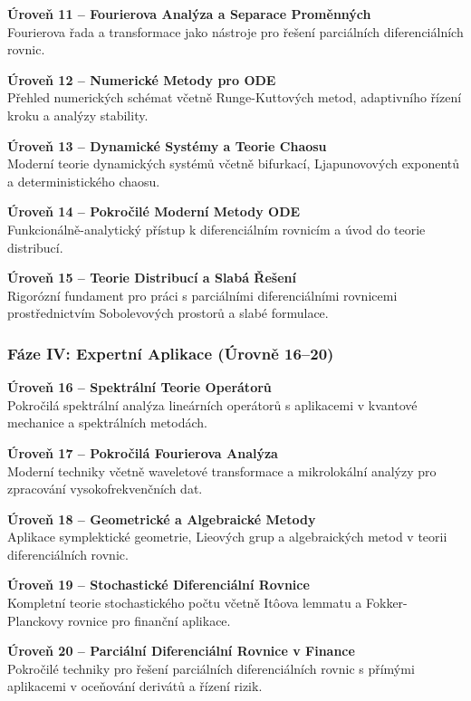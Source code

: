 \textbf{Úroveň 11 – Fourierova Analýza a Separace Proměnných}\\
Fourierova řada a transformace jako nástroje pro řešení parciálních diferenciálních rovnic.

\textbf{Úroveň 12 – Numerické Metody pro ODE}\\
Přehled numerických schémat včetně Runge-Kuttových metod, adaptivního řízení kroku a analýzy stability.

\textbf{Úroveň 13 – Dynamické Systémy a Teorie Chaosu}\\
Moderní teorie dynamických systémů včetně bifurkací, Ljapunovových exponentů a deterministického chaosu.

\textbf{Úroveň 14 – Pokročilé Moderní Metody ODE}\\
Funkcionálně-analytický přístup k diferenciálním rovnicím a úvod do teorie distribucí.

\textbf{Úroveň 15 – Teorie Distribucí a Slabá Řešení}\\
Rigorózní fundament pro práci s parciálními diferenciálními rovnicemi prostřednictvím Sobolevových prostorů a slabé formulace.

\subsubsection{Fáze IV: Expertní Aplikace (Úrovně 16–20)}

\textbf{Úroveň 16 – Spektrální Teorie Operátorů}\\
Pokročilá spektrální analýza lineárních operátorů s aplikacemi v kvantové mechanice a spektrálních metodách.

\textbf{Úroveň 17 – Pokročilá Fourierova Analýza}\\
Moderní techniky včetně waveletové transformace a mikrolokální analýzy pro zpracování vysokofrekvenčních dat.

\textbf{Úroveň 18 – Geometrické a Algebraické Metody}\\
Aplikace symplektické geometrie, Lieových grup a algebraických metod v teorii diferenciálních rovnic.

\textbf{Úroveň 19 – Stochastické Diferenciální Rovnice}\\
Kompletní teorie stochastického počtu včetně Itôova lemmatu a Fokker-Planckovy rovnice pro finanční aplikace.

\textbf{Úroveň 20 – Parciální Diferenciální Rovnice v Finance}\\
Pokročilé techniky pro řešení parciálních diferenciálních rovnic s přímými aplikacemi v oceňování derivátů a řízení rizik.

